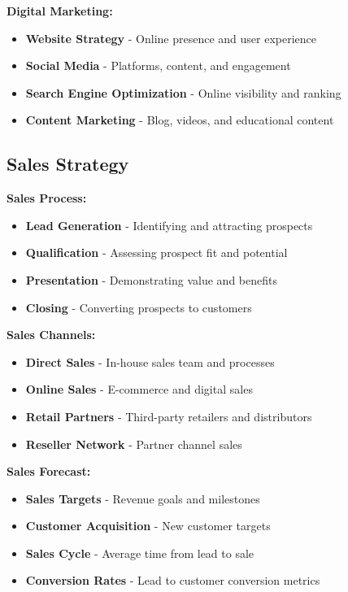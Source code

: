 \documentclass[12pt]{article}
\begin{document}
\textbf{Digital Marketing:}
\begin{itemize}
    \item \textbf{Website Strategy} - Online presence and user experience
    \item \textbf{Social Media} - Platforms, content, and engagement
    \item \textbf{Search Engine Optimization} - Online visibility and ranking
    \item \textbf{Content Marketing} - Blog, videos, and educational content
\end{itemize}

\subsection{Sales Strategy}

\textbf{Sales Process:}
\begin{itemize}
    \item \textbf{Lead Generation} - Identifying and attracting prospects
    \item \textbf{Qualification} - Assessing prospect fit and potential
    \item \textbf{Presentation} - Demonstrating value and benefits
    \item \textbf{Closing} - Converting prospects to customers
\end{itemize}

\textbf{Sales Channels:}
\begin{itemize}
    \item \textbf{Direct Sales} - In-house sales team and processes
    \item \textbf{Online Sales} - E-commerce and digital sales
    \item \textbf{Retail Partners} - Third-party retailers and distributors
    \item \textbf{Reseller Network} - Partner channel sales
\end{itemize}

\textbf{Sales Forecast:}
\begin{itemize}
    \item \textbf{Sales Targets} - Revenue goals and milestones
    \item \textbf{Customer Acquisition} - New customer targets
    \item \textbf{Sales Cycle} - Average time from lead to sale
    \item \textbf{Conversion Rates} - Lead to customer conversion metrics
\end{itemize}
\end{document}
